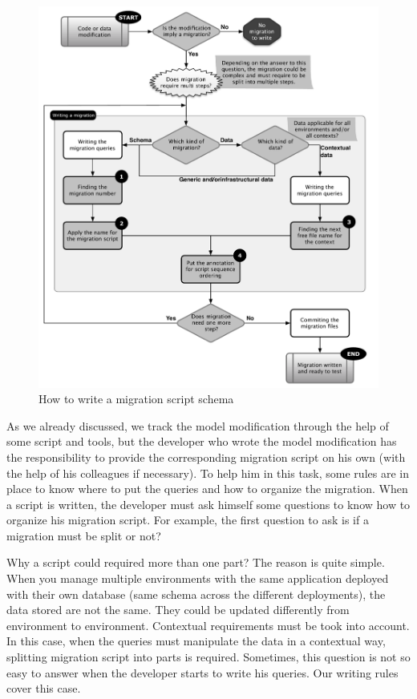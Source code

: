 \begin{figure}[h]
        \centering
        \includegraphics[scale=0.60]{images/mig-schema-gen-main.pdf}
        \caption{How to write a migration script schema}
        \label{fig:genMigScriptSchema}
\end{figure}

As we already discussed, we track the model modification through the help of some script and tools, but the developer who wrote the model modification has the responsibility to provide the corresponding migration script on his own (with the help of his colleagues if necessary). To help him in this task, some rules are in place to know where to put the queries and how to organize the migration. When a script is written, the developer must ask himself some questions to know how to organize his migration script. For example, the first question to ask is if a migration must be split or not?

Why a script could required more than one part? The reason is quite simple. When you manage multiple environments with the same application deployed with their own database (same schema across the different deployments), the data stored are not the same. They could be updated differently from environment to environment. Contextual requirements must be took into account. In this case, when the queries must manipulate the data in a contextual way, splitting migration script into parts is required. Sometimes, this question is not so easy to answer when the developer starts to write his queries. Our writing rules cover this case.

